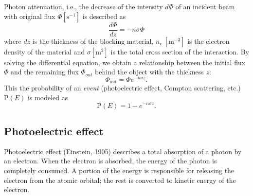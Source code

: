 \documentclass[a4paper,11pt,titlepage,twoside]{book}
\newcommand{\unit}[2]{$#1~\ensuremath{\mathrm{#2}}$}
\begin{document}
Photon attenuation, i.e., the decrease of the intensity $d\Phi$ of an incident beam with original flux $\Phi \left[\mathrm{s}^{-1}\right]$ is described as
\begin{equation}
  \frac{d\Phi}{dz} = -n\sigma\Phi
\end{equation}
where $dz$ is the thickness of the blocking material, \unit{n_e}{\left[m^{-3}\right]} is the electron density of the material and $\sigma \left[\mathrm{m}^{2}\right]$ is the total cross section of the interaction.
By solving the differential equation, we obtain a relationship between the initial flux $\Phi$ and the remaining flux $\Phi_{out}$ behind the object with the thickness $z$:
\begin{equation}
  \Phi_{out} = \Phi e^{-n\sigma z}.
\end{equation}
This the probability of an \emph{event} (photoelectric effect, Compton scattering, etc.) $\mathrm{P}\left(E\right)$ is modeled as
\begin{equation}
  \mathrm{P}\left(E\right) = 1 - e^{-n\sigma z}.
\end{equation}


\subsection{Photoelectric effect}


Photoelectric effect (Einstein, 1905) describes a total absorption of a photon by an electron.
When the electron is absorbed, the energy of the photon is completely consumed.
A portion of the energy is responsible for releasing the electron from the atomic orbital; the rest is converted to kinetic energy of the electron.
\end{document}
